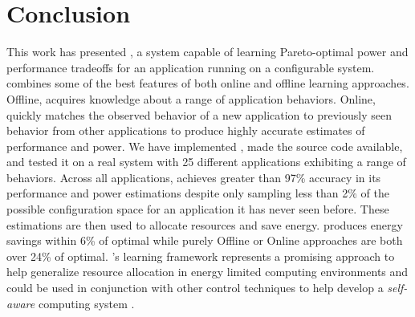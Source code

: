 \section{Conclusion}
\label{sec:conclusion}
This work has presented \SYSTEMLEO{}, a system capable of learning
Pareto-optimal power and performance tradeoffs for an application
running on a configurable system.  \SYSTEMLEO{} combines some of the best
features of both online and offline learning approaches.  Offline,
\SYSTEMLEO{} acquires knowledge about a range of application behaviors.
Online, \SYSTEMLEO{} quickly matches the observed behavior of a new
application to previously seen behavior from other applications to
produce highly accurate estimates of performance and power.  We have
implemented \SYSTEMLEO{}, made the source code available, and tested it
on a real system with 25 different applications exhibiting a range of
behaviors.  Across all applications, \SYSTEMLEO{} achieves greater than
97\% accuracy in its performance and power estimations despite only
sampling less than 2\% of the possible configuration space for an
application it has never seen before.  These estimations are then used
to allocate resources and save energy.  \SYSTEMLEO{} produces energy
savings within 6\% of optimal while purely Offline or Online
approaches are both over 24\% of optimal.  \SYSTEMLEO{}'s learning
framework represents a promising approach to help generalize resource
allocation in energy limited computing environments and could be used
in conjunction with other control techniques to help develop a
\emph{self-aware} computing system
\cite{Hoffmann2012,1508273,1333571,1516538,Kephardt2005,laddaga1999}.
